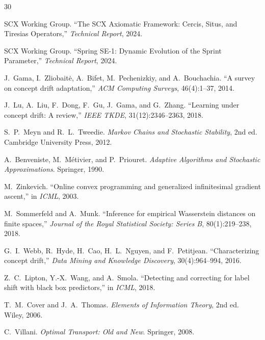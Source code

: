 \documentclass[12pt,a4paper]{article}
\begin{document}
\begin{thebibliography}{30}

SCX Working Group.
\newblock ``The SCX Axiomatic Framework: Cercis, Situs, and Tiresias
Operators,''
\newblock \emph{Technical Report}, 2024.

SCX Working Group.
\newblock ``Spring SE-1: Dynamic Evolution of the Sprint Parameter,''
\newblock \emph{Technical Report}, 2024.

J.~Gama, I.~Zliobait\.e, A.~Bifet, M.~Pechenizkiy, and A.~Bouchachia.
\newblock ``A survey on concept drift adaptation,''
\newblock \emph{ACM Computing Surveys}, 46(4):1--37, 2014.

J.~Lu, A.~Liu, F.~Dong, F.~Gu, J.~Gama, and G.~Zhang.
\newblock ``Learning under concept drift: A review,''
\newblock \emph{IEEE TKDE}, 31(12):2346--2363, 2018.

S.~P.~Meyn and R.~L.~Tweedie.
\newblock \emph{Markov Chains and Stochastic Stability}, 2nd ed.
\newblock Cambridge University Press, 2012.

A.~Benveniste, M.~M\'etivier, and P.~Priouret.
\newblock \emph{Adaptive Algorithms and Stochastic Approximations}.
\newblock Springer, 1990.

M.~Zinkevich.
\newblock ``Online convex programming and generalized infinitesimal gradient
ascent,''
\newblock in \emph{ICML}, 2003.

M.~Sommerfeld and A.~Munk.
\newblock ``Inference for empirical Wasserstein distances on finite
spaces,''
\newblock \emph{Journal of the Royal Statistical Society: Series B},
80(1):219--238, 2018.

G.~I.~Webb, R.~Hyde, H.~Cao, H.~L.~Nguyen, and F.~Petitjean.
\newblock ``Characterizing concept drift,''
\newblock \emph{Data Mining and Knowledge Discovery}, 30(4):964--994, 2016.

Z.~C.~Lipton, Y.-X.~Wang, and A.~Smola.
\newblock ``Detecting and correcting for label shift with black box
predictors,''
\newblock in \emph{ICML}, 2018.

T.~M.~Cover and J.~A.~Thomas.
\newblock \emph{Elements of Information Theory}, 2nd ed.
\newblock Wiley, 2006.

C.~Villani.
\newblock \emph{Optimal Transport: Old and New}.
\newblock Springer, 2008.

\end{thebibliography}
\end{document}
